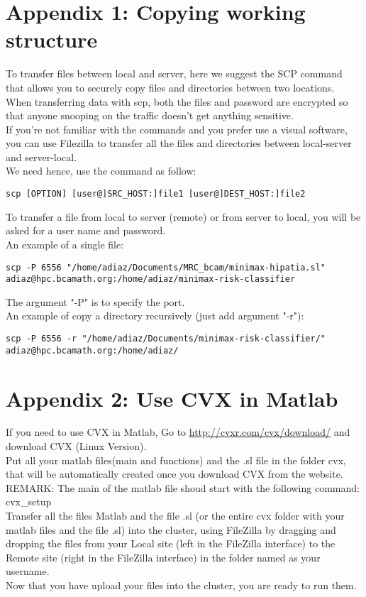 \documentclass[a4paper]{article}
\begin{document}
	\section{Appendix 1: Copying working structure}
		To transfer files between local and server, here we suggest the SCP command that allows you to securely copy files and directories between two locations.\\
		When transferring data with scp, both the files and password are encrypted so that anyone snooping on the traffic doesn’t get anything sensitive.\\
		If you're not familiar with the commands and you prefer use a visual software, you can use Filezilla to transfer all the files and directories between local-server and server-local.\\
		We need hence, use the command as follow:
		\begin{lstlisting}[caption=scp command, label=lst:scpCommand]
			scp [OPTION] [user@]SRC_HOST:]file1 [user@]DEST_HOST:]file2
		\end{lstlisting}
		To transfer a file from local to server (remote) or from server to local, you will be asked for a user name and password.\\
		An example of a single file:
		\begin{lstlisting}[caption=scp example file, label=lst:scpExampleFile]
			scp -P 6556 "/home/adiaz/Documents/MRC_bcam/minimax-hipatia.sl" adiaz@hpc.bcamath.org:/home/adiaz/minimax-risk-classifier 
		\end{lstlisting}
		The argument "-P" is to specify the port.\\
		An example of copy a directory recursively (just add argument "-r"):
		\begin{lstlisting}[caption=scp example directory, label=lst:scpExampleDirectory]
			scp -P 6556 -r "/home/adiaz/Documents/minimax-risk-classifier/" adiaz@hpc.bcamath.org:/home/adiaz/
		\end{lstlisting}
		
	\section{Appendix 2: Use CVX in Matlab}
		If you need to use CVX in Matlab, Go to \url{http://cvxr.com/cvx/download/} and download CVX (Linux Version).\\
		Put all your matlab files(main and functions) and the .sl file
		in the folder cvx, that will be automatically created once you download CVX
		from the website.\\
		REMARK: The main of the matlab file shoud start with the following command:
		cvx_setup\\
		Transfer all the files Matlab and the file .sl (or the entire
		cvx folder with your matlab files and the file .sl) into the cluster,
		using FileZilla by dragging and dropping the files from your Local site (left in
		the FileZilla interface) to the Remote site (right in the FileZilla interface) in the folder named as your username.\\
		Now that you have upload your files into the cluster, you are ready to run
		them.\\
\end{document}
